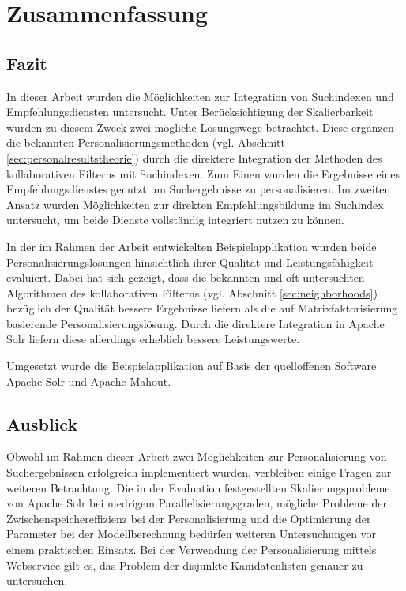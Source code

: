 
\section{Zusammenfassung}\label{sec:results}


\subsection{Fazit}

In dieser Arbeit wurden die Möglichkeiten zur Integration von Suchindexen und Empfehlungsdiensten untersucht. Unter Berücksichtigung der Skalierbarkeit wurden zu diesem Zweck zwei mögliche Lösungswege betrachtet. Diese ergänzen die bekannten Personalisierungsmethoden (vgl. Abschnitt \ref{sec:personalresultstheorie}) durch die direktere Integration der Methoden des kollaborativen Filterns mit Suchindexen. Zum Einen wurden die Ergebnisse eines Empfehlungsdienstes genutzt um Suchergebnisse zu personalisieren. Im zweiten Ansatz wurden Möglichkeiten zur direkten Empfehlungsbildung im Suchindex untersucht, um beide Dienste vollständig integriert nutzen zu können.

In der im Rahmen der Arbeit entwickelten Beispielapplikation wurden beide Personalisierungslösungen hinsichtlich ihrer Qualität und Leistungsfähigkeit evaluiert. Dabei hat sich gezeigt, dass die bekannten und oft untersuchten Algorithmen des kollaborativen Filterns (vgl. Abschnitt \ref{sec:neighborhoods}) bezüglich der Qualität bessere Ergebnisse liefern als die auf Matrixfaktorisierung basierende Personalisierungslösung. Durch die direktere Integration in Apache Solr liefern diese allerdings erheblich bessere Leistungswerte.

Umgesetzt wurde die Beispielapplikation auf Basis der quelloffenen Software Apache Solr und Apache Mahout.
\newpage
\subsection{Ausblick}

Obwohl im Rahmen dieser Arbeit zwei Möglichkeiten zur Personalisierung von Suchergebnissen erfolgreich implementiert wurden, verbleiben einige Fragen zur weiteren Betrachtung. Die in der Evaluation festgestellten Skalierungsprobleme von Apache Solr bei niedrigem Parallelisierungsgraden, mögliche Probleme der Zwischenspeichereffizienz bei der Personalisierung und die Optimierung der Parameter bei der Modellberechnung bedürfen weiteren Untersuchungen vor einem praktischen Einsatz. Bei der Verwendung der Personalisierung mittels Webservice gilt es, das Problem der disjunkte Kanidatenlisten genauer zu untersuchen.


